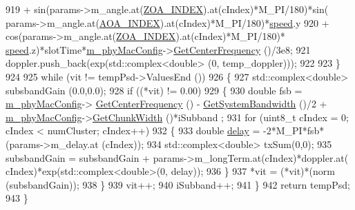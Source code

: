 \begin{DoxyCode}
919                                 + sin(params->m\_angle.at(\hyperlink{mmwave-3gpp-channel_8h_a86ab9a21bb66f50f7f4b0c0a0ee1f474}{ZOA\_INDEX}).at(cIndex)*M\_PI/180)*sin(
      params->m\_angle.at(\hyperlink{mmwave-3gpp-channel_8h_a7f1d5772b72f2ce425d85a2b41e8842f}{AOA\_INDEX}).at(cIndex)*M\_PI/180)*\hyperlink{mmwave-amc-test_8cc_a6dc6e6f3c75c509ce943163afb5dade7}{speed}.y
920                                 + cos(params->m\_angle.at(\hyperlink{mmwave-3gpp-channel_8h_a86ab9a21bb66f50f7f4b0c0a0ee1f474}{ZOA\_INDEX}).at(cIndex)*M\_PI/180)*
      \hyperlink{mmwave-amc-test_8cc_a6dc6e6f3c75c509ce943163afb5dade7}{speed}.z)*slotTime*\hyperlink{classns3_1_1MmWave3gppChannel_a50988766af948ea236ce24718a6dca7d}{m\_phyMacConfig}->\hyperlink{classns3_1_1MmWavePhyMacCommon_a0850d2e37c7075b9bce242723b722019}{GetCenterFrequency} ()/3e8;
921                 doppler.push\_back(exp(std::complex<double> (0, temp\_doppler)));
922 
923         \}
924 
925         \textcolor{keywordflow}{while} (vit != tempPsd->ValuesEnd ())
926         \{
927                 std::complex<double> subsbandGain (0.0,0.0);
928                 \textcolor{keywordflow}{if} ((*vit) != 0.00)
929                 \{
930                         \textcolor{keywordtype}{double} fsb = \hyperlink{classns3_1_1MmWave3gppChannel_a50988766af948ea236ce24718a6dca7d}{m\_phyMacConfig}->
      \hyperlink{classns3_1_1MmWavePhyMacCommon_a0850d2e37c7075b9bce242723b722019}{GetCenterFrequency} () - \hyperlink{classns3_1_1MmWave3gppChannel_aff34062721c2775f51890cbf23702d99}{GetSystemBandwidth} ()/2 + 
      \hyperlink{classns3_1_1MmWave3gppChannel_a50988766af948ea236ce24718a6dca7d}{m\_phyMacConfig}->\hyperlink{classns3_1_1MmWavePhyMacCommon_acc801566d527f1893d67a618ea3be203}{GetChunkWidth} ()*iSubband ;
931                         \textcolor{keywordflow}{for} (uint8\_t cIndex = 0; cIndex < numCluster; cIndex++)
932                         \{
933                                 \textcolor{keywordtype}{double} \hyperlink{lte_2model_2fading-traces_2fading__trace__generator_8m_a7964e6aa8f61a9d28973c8267a606ad8}{delay} = -2*M\_PI*fsb*(params->m\_delay.at (cIndex));
934                                 std::complex<double> txSum(0,0);
935                                 subsbandGain = subsbandGain + params->m\_longTerm.at(cIndex)*doppler.at(
      cIndex)*exp(std::complex<double>(0, delay));
936                         \}
937                         *vit = (*vit)*(norm (subsbandGain));
938                 \}
939                 vit++;
940                 iSubband++;
941         \}
942         \textcolor{keywordflow}{return} tempPsd;
943 \}
\end{DoxyCode}


